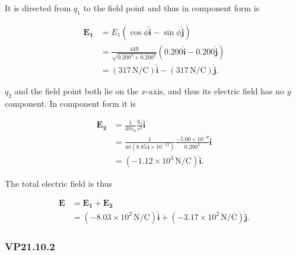 \documentclass{article}
\begin{document}
\begin{enumerate}[a)]
        It is directed from $q_1$ to the field point and thus in component form is

        \begin{align*}
          \mathbf{E_1} & = E_1(\cos\phi\hat{\mathbf{i}} - \sin\phi\hat{\mathbf{j}})                                       \\
                       & = \frac{449}{\sqrt{0.200^2 + 0.200^2}}(0.200\hat{\mathbf{i}} - 0.200\hat{\mathbf{j}})            \\
                       & = (317 \,\textrm{N}/\textrm{C})\hat{\mathbf{i}} - (317 \,\textrm{N}/\textrm{C})\hat{\mathbf{j}}.
        \end{align*}

        $q_2$ and the field point both lie on the $x$-axis, and thus its electric field has no $y$ component. In component form it is

        \begin{align*}
          \mathbf{E_2} & = \frac{1}{4 \pi \epsilon_0} \frac{q_2}{r^2} \hat{\mathbf{i}}                                   \\
                       & = \frac{1}{4 \pi (8.854 \times 10^{-12})} \frac{-5.00 \times 10^{-9}}{0.200^2} \hat{\mathbf{i}} \\
                       & = (-1.12 \times 10^{3} \,\textrm{N}/\textrm{C})\hat{\mathbf{i}}.
        \end{align*}

        The total electric field is thus

        \begin{align*}
          \mathbf{E} & = \mathbf{E_1} + \mathbf{E_2}                                                                                                \\
                     & = (-8.03 \times 10^2 \,\textrm{N}/\textrm{C})\hat{\mathbf{i}} + (-3.17 \times 10^2 \,\textrm{N}/\textrm{C})\hat{\mathbf{j}}.
        \end{align*}
\end{enumerate}

\subsubsection{VP21.10.2}
\end{document}
